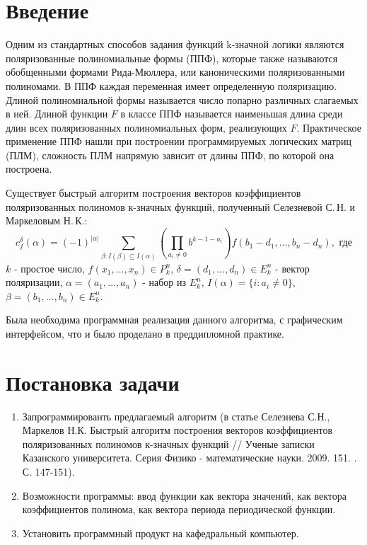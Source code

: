 \documentclass[a4paper, 14pt]{extarticle}
\begin{document}
\section{Введение}
Одним из стандартных способов задания функций k\nobreakdash-значной логики являются поляризованные полиномиальные формы (ППФ),
которые также называются обобщенными формами Рида-Мюллера, или каноническими поляризованными полиномами. В ППФ каждая переменная
имеет определенную поляризацию. Длиной полиномиальной формы называется число попарно различных слагаемых в ней. Длиной функции
$F$ в классе ППФ называется наименьшая длина среди длин всех поляризованных полиномиальных форм, реализующих $F$.
Практическое применение ППФ нашли при построении программируемых логических матриц (ПЛМ), сложность ПЛМ
напрямую зависит от длины ППФ, по которой она построена.

Существует быстрый алгоритм построения векторов коэффициентов поляризованных полиномов к-значных функций, полученный
Селезневой С.\,Н. и Маркеловым Н.\,К.:
$$
c^\delta_f(\alpha) = (-1)^{|\alpha|} \sum_{\beta:I(\beta) \subseteq I(\alpha)} \left(  \prod_{a_i \neq 0}b^{k-1-a_i} \right)
f(b_1 - d_1, \dotsc, b_n - d_n), \text{ где}
$$
$k$ - простое число, $f(x_1,\dotsc,x_n) \in P_k^n$, $\delta = (d_1, \dotsc, d_n) \in E_k^n$ - вектор поляризации,
$\alpha = (a_1, \dotsc, a_n)$ - набор из $E_k^n$, $I(\alpha) = \{i:a_i \neq 0\}$, $\beta = (b_1, \dotsc, b_n) \in E_k^n$.

Была необходима программная реализация данного алгоритма, с графическим интерфейсом, что и было проделано в преддипломной
практике.

\newpage

\section{Постановка задачи}
\begin{enumerate}
\item Запрограммированть предлагаемый алгоритм (в статье Селезнева С.Н., Маркелов Н.К. Быстрый алгоритм построения векторов
коэффициентов поляризованных полиномов к-значных функций // Ученые записки Казанского университета. Серия Физико - математические
науки. 2009. 151. . С. 147-151).
\item Возможности программы: ввод функции как вектора значений, как вектора коэффициентов полинома,
как вектора периода периодической функции.
\item Установить программный продукт на кафедральный компьютер.
\end{enumerate}
\end{document}
